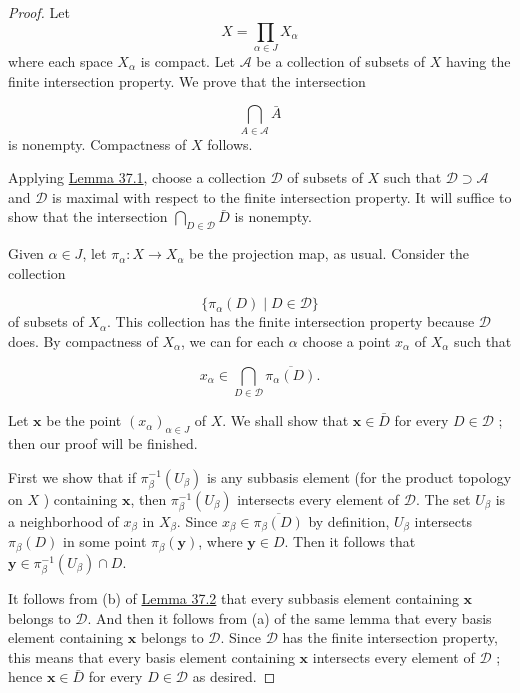 \begin{proof}
 Let
\[
X = \mathop{\prod }\limits_{{\alpha \in J}}X_{\alpha }
\]
where each space \(X_{\alpha }\) is compact. Let \(\mathcal{A}\) be a collection of subsets of \(X\) having the finite intersection property. We prove that the intersection

\[
\mathop{\bigcap }\limits_{{A \in \mathcal{A}}}\bar{A}
\]
is nonempty. Compactness of \(X\) follows.

Applying \hyperref[lem:37.1]{Lemma 37.1}, choose a collection \(\mathcal{D}\) of subsets of \(X\) such that \(\mathcal{D} \supset \mathcal{A}\) and \(\mathcal{D}\) is maximal with respect to the finite intersection property. It will suffice to show that the intersection \(\mathop{\bigcap }\limits_{{D \in \mathcal{D}}}\bar{D}\) is nonempty.

Given \(\alpha \in J\), let \({\pi }_{\alpha } : X \rightarrow {X}_{\alpha }\) be the projection map, as usual. Consider the collection

\[
\{ {{\pi }_{\alpha }(D) \mid D \in \mathcal{D}}\}
\]
of subsets of \(X_{\alpha }\). This collection has the finite intersection property because \(\mathcal{D}\) does. By compactness of \(X_{\alpha }\), we can for each \(\alpha\) choose a point \(x_{\alpha }\) of \(X_{\alpha }\) such that

\[
x_{\alpha } \in \mathop{\bigcap }\limits_{{D \in \mathcal{D}}}\overline{{\pi }_{\alpha }(D) }.
\]

Let \(\mathbf{x}\) be the point \({( x_{\alpha }) }_{\alpha \in J}\) of \(X\). We shall show that \(\mathbf{x} \in \bar{D}\) for every \(D \in \mathcal{D}\) ; then our proof will be finished.

First we show that if \({\pi }_{\beta }^{-1}( U_{\beta })\) is any subbasis element (for the product topology on \(X\) ) containing \(\mathbf{x}\), then \({\pi }_{\beta }^{-1}( U_{\beta })\) intersects every element of \(\mathcal{D}\). The set \(U_{\beta }\) is a neighborhood of \(x_{\beta }\) in \(X_{\beta }\). Since \(x_{\beta } \in \overline{{\pi }_{\beta }(D) }\) by definition, \(U_{\beta }\) intersects \({\pi }_{\beta }(D)\) in some point \({\pi }_{\beta }( \mathbf{y})\), where \(\mathbf{y} \in D\). Then it follows that \(\mathbf{y} \in {\pi }_{\beta }^{-1}( U_{\beta }) \cap D\).

It follows from (b) of \hyperref[lem:37.2]{Lemma 37.2} that every subbasis element containing \(\mathbf{x}\) belongs to \(\mathcal{D}\). And then it follows from (a) of the same lemma that every basis element containing \(\mathbf{x}\) belongs to \(\mathcal{D}\). Since \(\mathcal{D}\) has the finite intersection property, this means that every basis element containing \(\mathbf{x}\) intersects every element of \(\mathcal{D}\) ; hence \(\mathbf{x} \in \bar{D}\) for every \(D \in \mathcal{D}\) as desired.
\end{proof}
